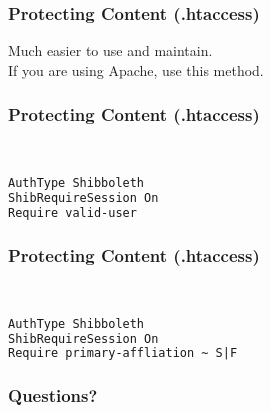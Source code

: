 \begin{frame}
\frametitle{Protecting Content (.htaccess)}
Much easier to use and maintain. \\ \bigskip
If you are using Apache, use this method.
\end{frame}

\begin{frame}[fragile]
\frametitle{Protecting Content (.htaccess)}
 \\
\begin{lstlisting}[language=XML,basicstyle=\ttfamily \small]
AuthType Shibboleth
ShibRequireSession On
Require valid-user
\end{lstlisting}
\end{frame}

\begin{frame}[fragile]
\frametitle{Protecting Content (.htaccess)}
 \\
\begin{lstlisting}[language=XML,basicstyle=\ttfamily \small]
AuthType Shibboleth
ShibRequireSession On
Require primary-affliation ~ S|F
\end{lstlisting}
\end{frame}

\begin{frame}
\frametitle{Questions?}
\end{frame}


